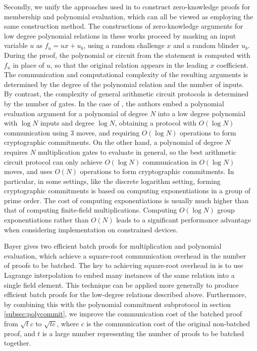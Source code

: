 Secondly, we unify the approaches used in \cite{GrothK15,BayerG13,BootleCCGGP15} to construct zero-knowledge proofs for membership and polynomial evaluation, which can all be viewed as employing the same construction method. The constructions of zero-knowledge arguments for low degree polynomial relations in these works proceed by masking an input variable $u$ as $f_u = ux+u_b$, using a random challenge $x$ and a random blinder $u_b$. During the proof, the polynomial or circuit from the statement is computed with $f_u$ in place of $u$, so that the original relation appears in the leading $x$ coefficient. The communication and computational complexity of the resulting arguments is determined by the degree of the polynomial relation and the number of inputs. By contrast, the complexity of general arithmetic circuit protocols is determined by the number of gates. In the case of \cite{BootleG18}, the authors embed a polynomial evaluation argument for a polynomial of degree $N$ into a low degree polynomial with $\log N$ inputs and degree $\log N$, obtaining a protocol with $O(\log N)$ communication using $3$ moves, and requiring $O(\log N)$ operations to form cryptographic commitments. On the other hand, a polynomial of degree $N$ requires $N$ multiplication gates to evaluate in general, so the best arithmetic circuit protocol \cite{BunzBBPWM18} can only achieve $O(\log N)$ communication in $O(\log N)$ moves, and uses $O(N)$ operations to form cryptographic commitments. In particular, in some settings, like the discrete logarithm setting, forming cryptographic commitments is based on computing exponentiations in a group of prime order. The cost of computing exponentiations is usually much higher than that of computing finite-field multiplications. Computing $O(\log N)$ group exponentiations rather than $O(N)$ leads to a significant performance advantage when considering implementation on constrained devices.

Bayer \cite{Bayer2014} gives two efficient batch proofs for multiplication and polynomial evaluation, which achieve a square-root communication overhead in the number of proofs to be batched. The key to achieving square-root overhead in \cite{Bayer2014} is to use Lagrange interpolation to embed many instances of the same relation into a single field element. This technique can be applied more generally to produce efficient batch proofs for the low-degree relations described above. Furthermore, by combining this with the polynomial commitment subprotocol in section \ref{subsec:polycommit}, we improve the communication cost of the batched proof from $\sqrt{t}c$ to $\sqrt{tc}$, where $c$ is the communication cost of the original non-batched proof, and $t$ is a large number representing the number of proofs to be batched together. 


